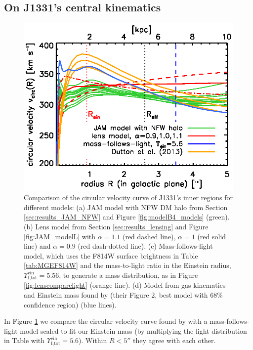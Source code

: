 \subsection{On J1331's central kinematics}

\begin{figure}
\centering
  \includegraphics[width=0.9\linewidth]{fig/B4_jam_profiles_errors_short_vcirc.ps}
  \caption{Comparison of the circular velocity curve of J1331's inner regions for different models: (a) JAM model with NFW DM halo from Section \ref{sec:results_JAM_NFW} and Figure \ref{fig:modelB4_models} (green). (b) Lens model from Section \ref{sec:results_lensing} and Figure \ref{fig:JAM_modelL} with $\alpha = 1.1$ (red dashed line), $\alpha = 1$ (red solid line) and $\alpha=0.9$ (red dash-dotted line). (c) Mass-follows-light model, which uses the F814W surface brightness in Table \ref{tab:MGEF814W} and the mass-to-light ratio in the Einstein radius, $\Upsilon^\text{ein}_\text{I,tot} = 5.56$, to generate a mass distribution, as in Figure \ref{fig:lenscomparelight} (orange line).  (d) Model from gas kinematics and Einstein mass found by \citet{SWELLSV} (their Figure 2, best model with 68\% confidence region) (blue lines). }
  \label{fig:vcirc_comparison}
\end{figure}

In Figure \ref{fig:vcirc_comparison} we compare the circular velocity curve found by \citet{SWELLSV} with a mass-follows-light model scaled to fit our Einstein mass (by multiplying the light distribution in Table \Wilma{[TO DO]} with $\Upsilon_\text{I,tot}^\text{ein} = 5.6$). Within $R < 5''$ they agree with each other. 

